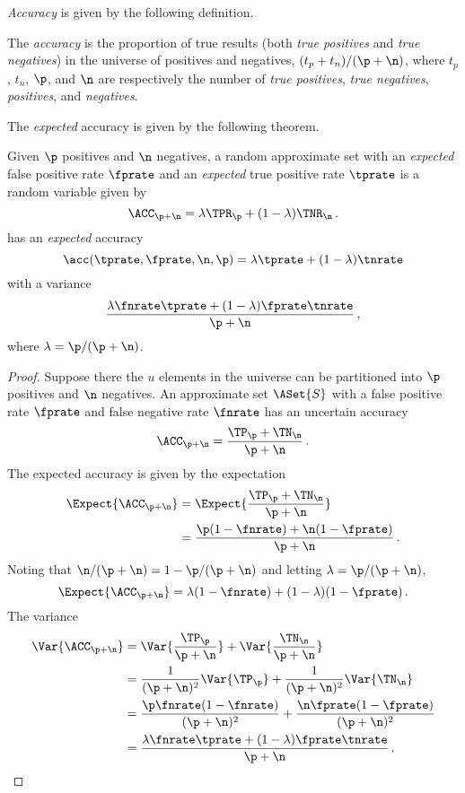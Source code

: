 \documentclass[ ../main.tex]{subfiles}
\begin{document}
\emph{Accuracy} is given by the following definition.
\begin{definition}
	The \emph{accuracy} is the proportion of true results (both \emph{true 
	positives} and \emph{true negatives}) in the universe of positives and 
	negatives, $(t_p + t_n)/(\p + \n)$, where $t_p$, $t_n$, $\p$, and $\n$ are 
	respectively the number of \emph{true positives}, \emph{true negatives}, 
	\emph{positives}, and \emph{negatives}.
\end{definition}

The \emph{expected} accuracy is given by the following theorem.
\begin{theorem}
	\label{thm:approx_expected_accuracy}
	Given $\p$ positives and $\n$ negatives, a random approximate set with an 
	\emph{expected} false positive rate $\fprate$ and an \emph{expected} true 
	positive rate $\tprate$ is a random variable given by
	\begin{equation}
		\ACC_{\p + \n} = \lambda \TPR_\p + (1 - \lambda) \TNR_\n\,.
	\end{equation}	
	has an \emph{expected} accuracy
	\begin{equation}
	\label{eq:approx_expected_accuracy}
	\acc(\tprate,\fprate,\n,\p) = \lambda \tprate + (1-\lambda) \tnrate
	\end{equation}
	with a variance
	\begin{equation}
	\frac{\lambda \fnrate \tprate + (1 - \lambda)\fprate 
		\tnrate}{\p+\n}\,,   
	\end{equation}
	where $\lambda = \p / (\p + \n)$.
\end{theorem}
\begin{proof}
	Suppose there the $u$ elements in the universe can be partitioned into $\p$ 
	positives and $\n$ negatives. An approximate set $\ASet{S}$ with a false 
	positive rate $\fprate$ and false negative rate $\fnrate$ has an uncertain 
	accuracy
	\begin{equation}
	\ACC_{\p + \n} = \frac{\TP_\p + \TN_\n}{\p + \n}\,.
	\end{equation}
	The expected accuracy is given by the expectation
	\begin{align}
	\Expect{\ACC_{\p + \n}}
	&= \Expect{\frac{\TP_\p + \TN_\n}{\p + \n}}\\
	&= \frac{\p (1 - \fnrate) + \n (1 - \fprate)}{\p + \n}\,.
	\end{align}
	Noting that $\n/(\p+\n) = 1 - \p/(\p+\n)$ and letting $\lambda = \p/(\p + 
	\n)$,
	\begin{equation}
	\Expect{\ACC_{\p + \n}} = \lambda (1 - \fnrate) + (1 - \lambda) (1 - 
	\fprate)\,.
	\end{equation}
	The variance
	\begin{align}
	\Var{\ACC_{\p + \n}}
	&= \Var{\frac{\TP_\p}{\p + \n}} + \Var{\frac{\TN_\n}{\p + \n}}\\
	&= \frac{1}{(\p + \n)^2}\Var{\TP_\p} + \frac{1}{(\p + \n)^2}\Var{\TN_\n}\\
	&= \frac{\p \fnrate (1 - \fnrate)}{(\p + \n)^2} + \frac{\n \fprate (1 - 
	\fprate)}{(\p + \n)^2}\\
	&= \frac{\lambda \fnrate \tprate + (1 - \lambda)\fprate 
		\tnrate}{\p+\n}\,.
	\end{align}
\end{proof}
\end{document}
